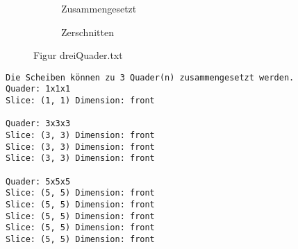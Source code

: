 \documentclass[a4paper,10pt,ngerman]{scrartcl}
\newcommand{\simplecube}[8]%
{
    \begin{scope}[shift={#1}]
        \fill[gray!40,canvas is yz plane at x=#2, opacity=#8] (0,0) rectangle (#3,#4);
        \fill[gray!10,canvas is xz plane at y=#3, opacity=#8] (0,0) rectangle (#2,#4);
        \fill[white  ,canvas is xy plane at z=#4, opacity=#8] (0,0) rectangle (#2,#3);
        \foreach\i/\j in {0/1, 1/1, 1/0}
            {
            \draw[line#5] (0,#3*\i,#4*\j) --++ (#2,0,0);
            \draw[line#6] (#2*\i,0,#4*\j) --++ (0,#3,0);
            \draw[line#7] (#2*\i,#3*\j,0) --++ (0,0,#4);
        }
    \end{scope}
}
\begin{document}
\begin{figure}[H]
\begin{subfigure}[b]{0.45\textwidth}
            \caption{Zusammengesetzt}\label{fig:figA4}
        \end{subfigure}
        \begin{subfigure}[b]{0.45\textwidth}
            \centering %
            \caption{Zerschnitten}\label{fig:figB4}
        \end{subfigure}
        \caption{Figur dreiQuader.txt}\label{fig:figAB4}
    \end{figure}

    \begin{lstlisting}[frame=single, title=Programmausgabe dreiQuader.txt, breaklines=true,label={lst:lstlisting5}]
Die Scheiben können zu 3 Quader(n) zusammengesetzt werden.
Quader: 1x1x1
Slice: (1, 1) Dimension: front

Quader: 3x3x3
Slice: (3, 3) Dimension: front
Slice: (3, 3) Dimension: front
Slice: (3, 3) Dimension: front

Quader: 5x5x5
Slice: (5, 5) Dimension: front
Slice: (5, 5) Dimension: front
Slice: (5, 5) Dimension: front
Slice: (5, 5) Dimension: front
Slice: (5, 5) Dimension: front
    \end{lstlisting}
\end{document}
